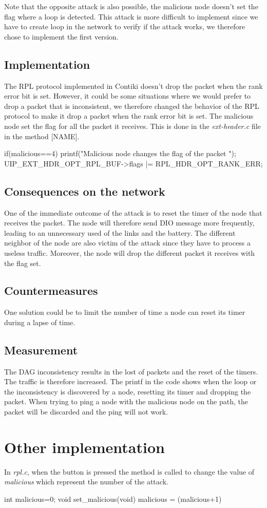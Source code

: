 \documentclass{report}
\begin{document}
Note that the opposite attack is also possible, the malicious node doesn't set the flag where a loop is detected. This attack is more difficult to implement since we have to create loop in the network to verify if the attack works, we therefore chose to implement the first version.

\subsection*{Implementation}
The RPL protocol implemented in Contiki doesn't drop the packet when the rank error bit is set. However, it could be some situations where we would prefer to drop a packet that is inconsistent, we therefore changed the behavior of the RPL protocol to make it drop a packet when the rank error bit is set. The malicious node set the flag for all the packet it receives. This is done in the \textit{ext-header.c} file in the method [NAME].

\begin{myc}
if(malicious==4){
	printf("Malicious node changes the flag of the packet \n");
	UIP_EXT_HDR_OPT_RPL_BUF->flags |= RPL_HDR_OPT_RANK_ERR;
}

\end{myc}
\subsection*{Consequences on the network}
One of the immediate outcome of the attack is to reset the timer of the node that receives the packet. The node will therefore send DIO message more frequently, leading to an unnecessary used of the links and the battery. The different neighbor of the node are also victim of the attack since they have to process a useless traffic. Moreover, the node will drop the different packet it receives with the flag set.

\subsection*{Countermeasures}

One solution could be to limit the number of time a node can reset its timer during a lapse of time. 
\subsection*{Measurement}
The DAG inconsistency results in the lost of packets and the reset of the timers. The traffic is therefore increased. The printf in the code shows when the loop or the inconsistency is discovered by a node, resetting its timer and dropping the packet. 
When trying to ping a node with the malicious node on the path, the packet will be discarded and the ping will not work. 

\section{Other implementation}
In \textit{rpl.c}, when the button is pressed the method is called to change the value of \textit{malicious} which represent the number of the attack.

\begin{myc}
int malicious=0;
void
set_malicious(void){
	malicious = (malicious+1)%
}
\end{myc}
\end{document}
